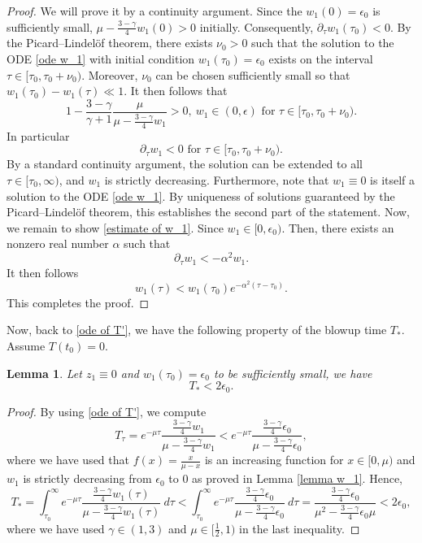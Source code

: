 \documentclass{article}
\newcommand{\ga}{\gamma}
\newcommand{\al}{\alpha}
\newcommand{\pa}{\partial}
\def\be{\begin{equation}}
\def\ee{\end{equation}}
\numberwithin{equation}{section}
\newtheorem{lemma}[theorem]{Lemma}
\begin{document}
\begin{proof}
	We will prove it by a continuity argument. Since the $w_1(0)=\epsilon_0$ is sufficiently small, $\mu-\frac{3-\ga}{4}w_1(0)>0$ initially. Consequently, $\pa_\tau w_1(\tau_0)<0$. By the Picard–Lindelöf theorem, there exists $\nu_0 > 0$ such that the solution to the ODE \eqref{ode w_1} with initial condition $w_1(\tau_0) = \epsilon_0$ exists on the interval $\tau \in [\tau_0,\tau_0+\nu_0)$. Moreover, $\nu_0$ can be chosen sufficiently small so that $w_1(\tau_0)-w_1(\tau)\ll 1$. It then follows that 
	\[
		1-\frac{3-\ga}{\ga+1}\frac{\mu}{\mu-\frac{3-\ga}{4}w_1}>0, \ w_1\in(0,\epsilon) \text{ for }\tau\in[\tau_0,\tau_0+\nu_0).
	\]
	In particular 
	\[
		\pa_\tau w_1<0\text{ for }\tau\in[\tau_0,\tau_0+\nu_0).
	\]
	By a standard continuity argument, the solution can be extended to all $\tau \in [\tau_0,\infty)$, and $w_1$ is strictly decreasing. Furthermore, note that $w_1 \equiv 0$ is itself a solution to the ODE \eqref{ode w_1}. By uniqueness of solutions guaranteed by the Picard–Lindelöf theorem, this establishes the second part of the statement. Now, we remain to show \eqref{estimate of w_1}. Since $w_1\in[0,\epsilon_0)$. Then, there exists an nonzero real number $\al$ such that
	\[
		\pa_\tau w_1 < -\al^2 w_1.
	\]
	It then follows %
	\[
		w_1(\tau)< w_1(\tau_0)e^{-\al^2 (\tau-\tau_0)}.
	\]
	This completes the proof.
\end{proof}
Now, back to \eqref{ode of T'}, we have the following property of the blowup time $T_*$. Assume $T(t_0)=0$. 
\begin{lemma}
	Let $z_1\equiv 0$ and $w_1(\tau_0)=\epsilon_0$ to be sufficiently small, we have
	\be
		T_*  < 2\epsilon_0 . 
	\ee
\end{lemma}
\begin{proof}
	By using \eqref{ode of T'}, we compute
	\[
		T_\tau = e^{-\mu\tau} \frac{\frac{3-\ga}{4}w_1}{\mu-\frac{3-\ga}{4}w_1}<e^{-\mu\tau} \frac{\frac{3-\ga}{4}\epsilon_0}{\mu-\frac{3-\ga}{4}\epsilon_0},
	\]
	where we have used that $f(x) = \frac{x}{\mu-x}$ is an increasing function for $x\in[0,\mu)$ and $w_1$ is strictly decreasing from $\epsilon_0$ to 0 as proved in Lemma \ref{lemma w_1}. Hence, 
	\be
		T_*  = \int_{\tau_0}^\infty e^{-\mu\tau} \frac{\frac{3-\ga}{4}w_1(\tau)}{\mu-\frac{3-\ga}{4}w_1(\tau)} \ d\tau < \int_{\tau_0}^\infty e^{-\mu\tau} \frac{\frac{3-\ga}{4}\epsilon_0}{\mu-\frac{3-\ga}{4}\epsilon_0} \ d\tau = \frac{\frac{3-\ga}{4}\epsilon_0}{\mu^2-\frac{3-\ga}{4}\epsilon_0\mu}< 2\epsilon_0,
	\ee
	where we have used $\ga\in(1,3)$ and $\mu\in[\frac12,1)$ in the last inequality.
\end{proof}
\end{document}

